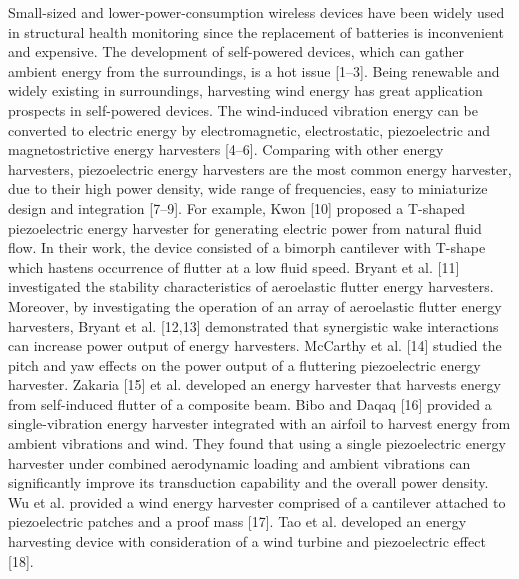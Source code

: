 \documentclass{article}
\begin{document}
Small-sized and lower-power-consumption wireless devices have been widely used in structural health monitoring since the replacement of batteries is inconvenient and expensive. The development of self-powered
devices, which can gather ambient energy from the surroundings, is a hot issue [1–3]. Being renewable
and widely existing in surroundings, harvesting wind energy has great application prospects in self-powered
devices. The wind-induced vibration energy can be converted to electric energy by electromagnetic, electrostatic, piezoelectric and magnetostrictive energy harvesters [4–6]. Comparing with other energy harvesters,
piezoelectric energy harvesters are the most common energy harvester, due to their high power density, wide
range of frequencies, easy to miniaturize design and integration [7–9]. For example, Kwon [10] proposed a
T-shaped piezoelectric energy harvester for generating electric power from natural fluid flow. In their work,
the device consisted of a bimorph cantilever with T-shape which hastens occurrence of flutter at a low fluid
speed. Bryant et al. [11] investigated the stability characteristics of aeroelastic flutter energy harvesters. Moreover, by investigating the operation of an array of aeroelastic flutter energy harvesters, Bryant et al. [12,13]
demonstrated that synergistic wake interactions can increase power output of energy harvesters. McCarthy et
al. [14] studied the pitch and yaw effects on the power output of a fluttering piezoelectric energy harvester.
Zakaria [15] et al. developed an energy harvester that harvests energy from self-induced flutter of a composite
beam. Bibo and Daqaq [16] provided a single-vibration energy harvester integrated with an airfoil to harvest
energy from ambient vibrations and wind. They found that using a single piezoelectric energy harvester under
combined aerodynamic loading and ambient vibrations can significantly improve its transduction capability
and the overall power density. Wu et al. provided a wind energy harvester comprised of a cantilever attached to
piezoelectric patches and a proof mass [17]. Tao et al. developed an energy harvesting device with consideration
of a wind turbine and piezoelectric effect [18].
\end{document}
